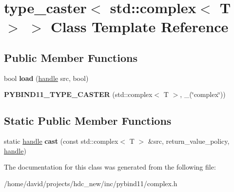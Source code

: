 \hypertarget{classtype__caster_3_01std_1_1complex_3_01_t_01_4_01_4}{}\section{type\+\_\+caster$<$ std\+:\+:complex$<$ T $>$ $>$ Class Template Reference}
\label{classtype__caster_3_01std_1_1complex_3_01_t_01_4_01_4}
\subsection*{Public Member Functions}
\begin{DoxyCompactItemize}
\item 
bool {\bfseries load} (\hyperlink{classhandle}{handle} src, bool)\hypertarget{classtype__caster_3_01std_1_1complex_3_01_t_01_4_01_4_a1a10543b374e283b82a8f9d159189557}{}\label{classtype__caster_3_01std_1_1complex_3_01_t_01_4_01_4_a1a10543b374e283b82a8f9d159189557}

\item 
{\bfseries P\+Y\+B\+I\+N\+D11\+\_\+\+T\+Y\+P\+E\+\_\+\+C\+A\+S\+T\+ER} (std\+::complex$<$ T $>$, \+\_\+(\char`\"{}complex\char`\"{}))\hypertarget{classtype__caster_3_01std_1_1complex_3_01_t_01_4_01_4_a58b7128eed3564ae4060242f99c8dd61}{}\label{classtype__caster_3_01std_1_1complex_3_01_t_01_4_01_4_a58b7128eed3564ae4060242f99c8dd61}

\end{DoxyCompactItemize}
\subsection*{Static Public Member Functions}
\begin{DoxyCompactItemize}
\item 
static \hyperlink{classhandle}{handle} {\bfseries cast} (const std\+::complex$<$ T $>$ \&src, return\+\_\+value\+\_\+policy, \hyperlink{classhandle}{handle})\hypertarget{classtype__caster_3_01std_1_1complex_3_01_t_01_4_01_4_ae0a66f06eff200f0ea8105945f5e39de}{}\label{classtype__caster_3_01std_1_1complex_3_01_t_01_4_01_4_ae0a66f06eff200f0ea8105945f5e39de}

\end{DoxyCompactItemize}


The documentation for this class was generated from the following file\+:\begin{DoxyCompactItemize}
\item 
/home/david/projects/hdc\+\_\+new/inc/pybind11/complex.\+h\end{DoxyCompactItemize}
